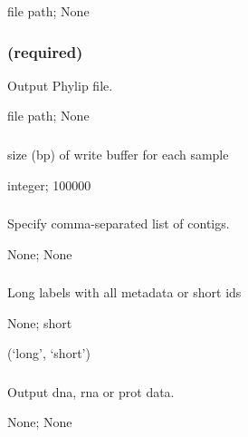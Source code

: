 \documentclass[letterpaper,11pt,english]{sphinxmanual}
\begin{document}
 file path;  None


\subsubsection{ (required)}
\label{\detokenize{prog_desc:id23}}
 Output Phylip file.

 file path;  None


\subsubsection{}
\label{\detokenize{prog_desc:id24}}
 size (bp) of write buffer for each sample

 integer;  100000


\subsubsection{}
\label{\detokenize{prog_desc:contigs}}
 Specify comma-separated list of contigs.

 None;  None


\subsubsection{}
\label{\detokenize{prog_desc:id25}}
 Long labels with all metadata or short ids

 None;  short

 (‘long’, ‘short’)


\subsubsection{}
\label{\detokenize{prog_desc:id26}}
 Output dna, rna or prot data.

 None;  None
\end{document}
